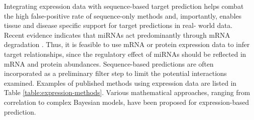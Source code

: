 Integrating expression data with sequence-based target prediction helps combat
the high false-positive rate of sequence-only methods and, importantly,
enables tissue and disease specific support for target predictions in real-
world data. Recent evidence indicates that miRNAs act predominantly through
mRNA degradation \citep{Guo2010}. Thus, it is feasible to use mRNA or protein
expression data to infer target relationships, since the regulatory effect of
miRNAs should be reflected in mRNA and protein abundances. Sequence-based
predictions are often incorporated as a preliminary filter step to limit the
potential interactions examined. Examples of published methods using
expression data are listed in Table \ref{table:expression-methods}. Various
mathematical approaches, ranging from correlation to complex Bayesian models,
have been proposed for expression-based prediction.



